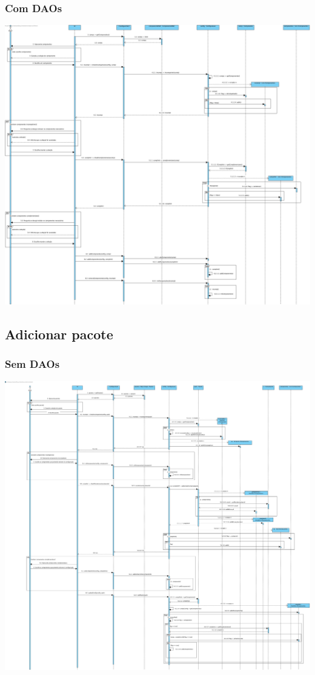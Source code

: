 \subsubsection{Com DAOs}
\begin{center}
 	\includegraphics[width = 5.5in]{DSI_D/DSI-c_DAOs-Adicionar_Componente.jpg}
\end{center}


\subsection{Adicionar pacote}
\subsubsection{Sem DAOs}
\begin{center}
 	\includegraphics[width = 5.5in]{DSI/DSI-Adicionar_Pacote.jpg}
\end{center}
